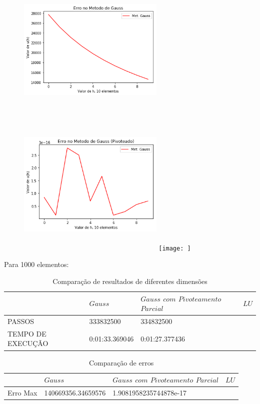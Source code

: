 \documentclass{article}
\begin{document}
\begin{figure}[!htb]
\includegraphics[width=7cm,height=7cm]{EGauss10part.png}
\includegraphics [width=7cm,height=7cm]{EGaussP10part.png}
\texttt{[image: ]}
\end{figure}

\newpage
Para 1000 elementos:

\begin{table}[h]
\centering
  \begin{tabular}{l||l|l|l}
     & $ Gauss$ & $Gauss$ $com$ $Pivoteamento$ $Parcial$ & $LU$ \\
    \hline
    
    PASSOS & 333832500 & 334832500 & \\
    
    TEMPO DE EXECUÇÃO &  0:01:33.369046 & 0:01:27.377436 & \\
    
    \hline
  \end{tabular}
  \caption{Comparação de resultados de diferentes dimensões}
\end{table}

\begin{table}[h]
\centering
  \begin{tabular}{l||l|l|l}
     & $ Gauss$ & $Gauss$ $com$ $Pivoteamento$ $Parcial$ & $LU$ \\
    \hline
    
    Erro Max & 140669356.34659576 & 1.9081958235744878e-17 & \\
    
    
    \hline
  \end{tabular}
  \caption{Comparação de erros}
\end{table}
\end{document}
